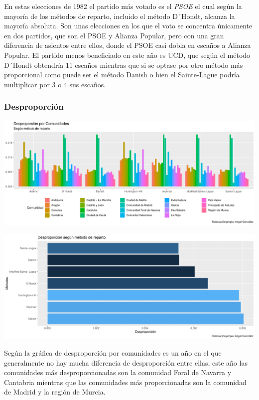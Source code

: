 \documentclass[12pt,a4paper,]{book}
\numberwithin{dummy}{section}
\theoremstyle{ocrenumbox}
\theoremstyle{blacknumex}
\theoremstyle{blacknumbox}
\theoremstyle{ocrenum}
\theoremstyle{ocrenum}
\begin{document}
En estas elecciones de 1982 el partido más votado es el \emph{PSOE} el
cual según la mayoría de los métodos de reparto, incluido el método
D´Hondt, alcanza la mayoría absoluta. Son unas elecciones en los que el
voto se concentra únicamente en dos partidos, que son el PSOE y Alianza
Popular, pero con una gran diferencia de asientos entre ellos, donde el
PSOE casi dobla en escaños a Alianza Popular. El partido menos
beneficiado en este año es UCD, que según el método D´Hondt obtendría 11
escaños mientras que si se optase por otro método más proporcional como
puede ser el método Danish o bien el Sainte-Lague podría multiplicar por
3 o 4 sus escaños.

\hypertarget{desproporciuxf3n-2}{%
\subsubsection{Desproporción}\label{desproporciuxf3n-2}}

\begin{center}\includegraphics[width=0.95\linewidth]{figurasR/unnamed-chunk-81-1} \end{center}

\begin{center}\includegraphics[width=0.95\linewidth]{figurasR/unnamed-chunk-81-2} \end{center}

Según la gráfica de desproporción por comunidades es un año en el que
generalmente no hay mucha diferencia de desproporción entre ellas, este
año las comunidades más desproporcionadas son la comunidad Foral de
Navarra y Cantabria mientras que las comunidades más proporcionadas son
la comunidad de Madrid y la región de Murcia.
\end{document}
